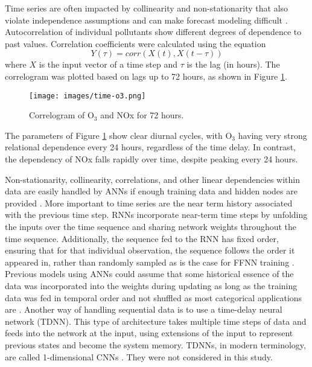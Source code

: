 Time series are often impacted by collinearity and non-stationarity that also violate independence assumptions and can make forecast modeling difficult \citep{Gheyas2011}. Autocorrelation of individual pollutants show different degrees of dependence to past values.  Correlation coefficients were calculated using the equation
%
\begin{equation}
\label{eq:corr}
Y(\tau)= corr(X(t),X(t - \tau))
\end{equation}
%
\noindent
where $X$ is the input vector of a time step and $\tau$ is the lag (in hours). The correlogram was plotted based on lags up to 72 hours, as shown in Figure \ref{fig:serialcorr}.
%
\begin{figure}[H]
\centering
\texttt{[image: images/time-o3.png]}  %
\caption{Correlogram of O$_{3}$ and NOx for 72 hours.}
\label{fig:serialcorr}
\end{figure}
%
The parameters of Figure \ref{fig:serialcorr} show clear diurnal cycles, with O$_{3}$ having very strong relational dependence every 24 hours, regardless of the time delay. In contrast, the dependency of NOx falls rapidly over time, despite peaking every 24 hours. 

Non-stationarity, collinearity, correlations, and other linear dependencies within data are easily handled by ANNs if enough training data and hidden nodes are provided \citep{Goodfellow2016}. More important to time series are the near term history associated with the previous time step. RNNs incorporate near-term time steps by unfolding the inputs over the time sequence and sharing network weights throughout the time sequence. Additionally, the sequence fed to the RNN has fixed order, ensuring that for that individual observation, the sequence follows the order it appeared in, rather than randomly sampled as is the case for FFNN training \citep{Elangasinghe2014}. Previous models using ANNs could assume that some historical essence of the data was incorporated into the weights during updating as long as the training data was fed in temporal order and not shuffled as most categorical applications are \citep{Bengio2012}. Another way of handling sequential data is to use a time-delay neural network (TDNN). This type of architecture takes multiple time steps of data and feeds into the network at the input, using extensions of the input to represent previous states and become the system memory. TDNNs, in modern terminology, are called 1-dimensional CNNs \citep{Goodfellow2016}. They were not considered in this study.


